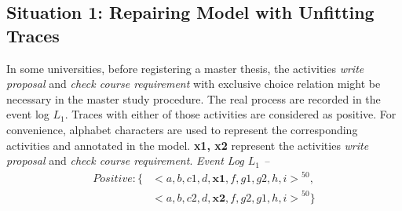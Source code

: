 \subsection{Situation 1: \small{Repairing Model with Unfitting Traces}} %
In some universities, before registering a master thesis, the activities \emph{write proposal} and \emph{check course requirement} with exclusive choice relation might be necessary in the master study procedure. The real process are recorded in the event log $L_1$. Traces with either of those activities are considered as positive. For convenience, alphabet characters are used to represent the corresponding activities and annotated in the model. \textbf{x1, x2} represent the activities \emph{write proposal} and \emph{check course requirement}.
\emph{Event Log $L_1$ -- }
		\begin{align*}
		Positive:\{ & { <a,b, c1,d,\textbf{x1},f,g1,g2,h,i>}^{50}, \\   &{<a,b, c2,d,\textbf{x2},f,g2,g1,h,i>}^{50} \}
		\end{align*}
